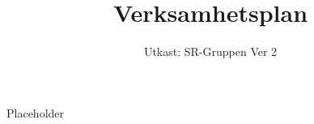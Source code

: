 \documentclass[a4paper]{dtek}
\title{Verksamhetsplan}
\date{Utkast: SR-Gruppen Ver 2}
\begin{document}
Placeholder
\end{document}

